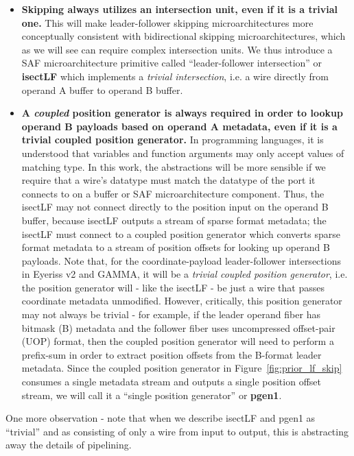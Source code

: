 \begin{itemize}
    \item \textbf{Skipping always utilizes an intersection unit, even if it is a trivial one.} This will make leader-follower skipping microarchitectures more conceptually consistent with bidirectional skipping microarchitectures, which as we will see can require complex intersection units. We thus introduce a SAF microarchitecture primitive called ``leader-follower intersection'' or \textbf{isectLF} which implements a \textit{trivial intersection}, i.e. a wire directly from operand A buffer to operand B buffer.
    \item \textbf{A \textit{coupled} position generator is always required in order to lookup operand B payloads based on operand A metadata, even if it is a trivial coupled position generator.} In programming languages, it is understood that variables and function arguments may only accept values of matching type. In this work, the abstractions will be more sensible if we require that a wire's datatype must match the datatype of the port it connects to on a buffer or SAF microarchitecture component. Thus, the isectLF may not connect directly to the position input on the operand B buffer, because isectLF outputs a stream of sparse format metadata; the isectLF must connect to a coupled position generator which converts sparse format metadata to a stream of position offsets for looking up operand B payloads. Note that, for the coordinate-payload leader-follower intersections in Eyeriss v2\cite{eyerissv2} and GAMMA\cite{gamma}, it will be a \textit{trivial coupled position generator}, i.e. the position generator will - like the isectLF - be just a wire that passes coordinate metadata unmodified. However, critically, this position generator may not always be trivial - for example, if the leader operand fiber has bitmask (B) metadata and the follower fiber uses uncompressed offset-pair (UOP)\cite{sparseloop} format, then the coupled position generator will need to perform a prefix-sum in order to extract position offsets from the B-format leader metadata. Since the coupled position generator in Figure~\ref{fig:prior_lf_skip} consumes a single metadata stream and outputs a single position offset stream, we will call it a ``single position generator'' or \textbf{pgen1}.
\end{itemize}

One more observation - note that when we describe isectLF and pgen1 as ``trivial'' and as consisting of only a wire from input to output, this is abstracting away the details of pipelining.

